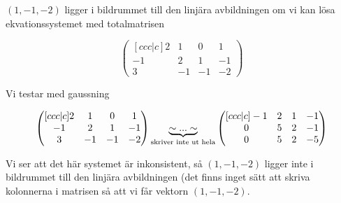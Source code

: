 \documentclass[../../main.tex]{subfiles}
\begin{document}
\begin{solution}{15}

$(1, -1, -2)$ ligger i bildrummet till den linjära avbildningen om vi kan lösa ekvationssystemet med totalmatrisen

$$
\begin{pmatrix}[ccc|c]
2&1&0&1\\
-1&2&1&-1\\
3&-1&-1&-2
\end{pmatrix}
$$

Vi testar med gaussning

$$
\begin{pmatrix}[ccc|c]
2&1&0&1\\
-1&2&1&-1\\
3&-1&-1&-2
\end{pmatrix}
\underbrace{\sim ... \sim}_{\text{skriver inte ut hela}}
\begin{pmatrix}[ccc|c]
-1&2&1&-1\\
0&5&2&-1\\
0&5&2&-5
\end{pmatrix}
$$

Vi ser att det här systemet är inkonsistent, så $(1, -1, -2)$ ligger inte i bildrummet till den linjära avbildningen (det finns inget sätt att skriva kolonnerna i matrisen så att vi får vektorn $(1, -1, -2)$.


\end{solution}
\end{document}
